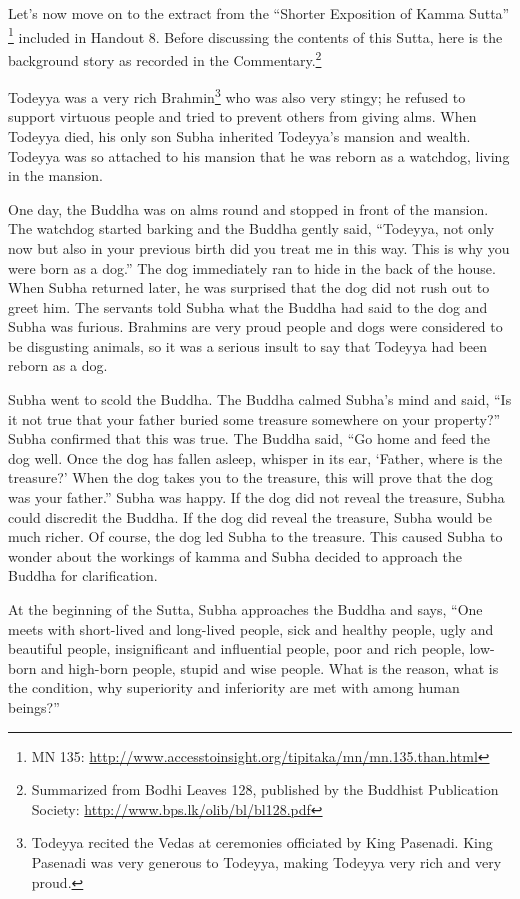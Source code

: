 Let’s now move on to the extract from the “Shorter Exposition of Kamma Sutta” \footnote{MN 135: \url{http://www.accesstoinsight.org/tipitaka/mn/mn.135.than.html}} included in Handout 8. Before discussing the contents of this Sutta, here is the background story as recorded in the Commentary.\footnote{Summarized from Bodhi Leaves 128, published by the Buddhist Publication Society: \url{http://www.bps.lk/olib/bl/bl128.pdf}}

Todeyya was a very rich Brahmin\footnote{Todeyya recited the Vedas at ceremonies officiated by King Pasenadi. King Pasenadi was very generous to Todeyya, making Todeyya very rich and very proud.} who was also very stingy; he refused to support virtuous people and tried to prevent others from giving alms. When Todeyya died, his only son Subha inherited Todeyya’s mansion and wealth. Todeyya was so attached to his mansion that he was reborn as a watchdog, living in the mansion.

One day, the Buddha was on alms round and stopped in front of the mansion. The watchdog started barking and the Buddha gently said, “Todeyya, not only now but also in your previous birth did you treat me in this way. This is why you were born as a dog.” The dog immediately ran to hide in the back of the house. When Subha returned later, he was surprised that the dog did not rush out to greet him. The servants told Subha what the Buddha had said to the dog and Subha was furious. Brahmins are very proud people and dogs were considered to be disgusting animals, so it was a serious insult to say that Todeyya had been reborn as a dog.

Subha went to scold the Buddha. The Buddha calmed Subha’s mind and said, “Is it not true that your father buried some treasure somewhere on your property?” Subha confirmed that this was true. The Buddha said, “Go home and feed the dog well. Once the dog has fallen asleep, whisper in its ear, ‘Father, where is the treasure?’ When the dog takes you to the treasure, this will prove that the dog was your father.” Subha was happy. If the dog did not reveal the treasure, Subha could discredit the Buddha. If the dog did reveal the treasure, Subha would be much richer. Of course, the dog led Subha to the treasure. This caused Subha to wonder about the workings of kamma and Subha decided to approach the Buddha for clarification.

At the beginning of the Sutta, Subha approaches the Buddha and says, “One meets with short-lived and long-lived people, sick and healthy people, ugly and beautiful people, insignificant and influential people, poor and rich people, low-born and high-born people, stupid and wise people. What is the reason, what is the condition, why superiority and inferiority are met with among human beings?”

